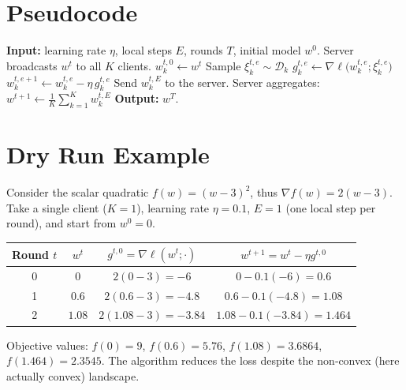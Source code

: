 \documentclass{article}
\begin{document}
\section*{Pseudocode}
\begin{algorithm}[H]
\caption{FedAvg‑LSGD}
\begin{algorithmic}[1]
\State \textbf{Input:} learning rate $\eta$, local steps $E$, rounds $T$, initial model $w^{0}$.
    \State Server broadcasts $w^{t}$ to all $K$ clients.
        \State $w^{t,0}_{k}\gets w^{t}$
            \State Sample $\xi^{t,e}_{k}\sim\mathcal{D}_{k}$
            \State $g^{t,e}_{k}\gets \nabla\ell\big(w^{t,e}_{k};\xi^{t,e}_{k}\big)$
            \State $w^{t,e+1}_{k}\gets w^{t,e}_{k}-\eta\, g^{t,e}_{k}$
        \EndFor
        \State Send $w^{t,E}_{k}$ to the server.
    \EndFor
    \State Server aggregates: $w^{t+1}\gets \frac{1}{K}\sum_{k=1}^{K} w^{t,E}_{k}$
\EndFor
\State \textbf{Output:} $w^{T}$.
\end{algorithmic}
\end{algorithm}

\section*{Dry Run Example}
Consider the scalar quadratic $f(w)=(w-3)^{2}$, thus $\nabla f(w)=2(w-3)$.  
Take a single client ($K=1$), learning rate $\eta=0.1$, $E=1$ (one local step per round), and start from $w^{0}=0$.

\begin{center}
\begin{tabular}{c|c|c|c}
Round $t$ & $w^{t}$ & $g^{t,0}= \nabla\ell(w^{t};\cdot)$ & $w^{t+1}=w^{t}-\eta g^{t,0}$\\ \hline
0 & $0$ & $2(0-3)=-6$ & $0-0.1(-6)=0.6$\\
1 & $0.6$ & $2(0.6-3)=-4.8$ & $0.6-0.1(-4.8)=1.08$\\
2 & $1.08$ & $2(1.08-3)=-3.84$ & $1.08-0.1(-3.84)=1.464$\\
\end{tabular}
\end{center}
Objective values: $f(0)=9$, $f(0.6)=5.76$, $f(1.08)=3.6864$, $f(1.464)=2.3545$.  
The algorithm reduces the loss despite the non‑convex (here actually convex) landscape.

\newpage
\end{document}
